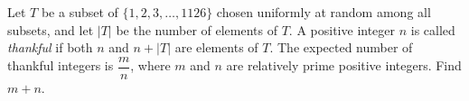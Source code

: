 Let $T$ be a subset of $\{1,2,3,\dots,1126\}$ chosen uniformly at random among all subsets, and let $|T|$ be the number of elements of $T$. A positive integer $n$ is called \emph{thankful} if both $n$ and $n+|T|$ are elements of $T$. The expected number of thankful integers is $\dfrac mn$, where $m$ and $n$ are relatively prime positive integers. Find $m+n$.
